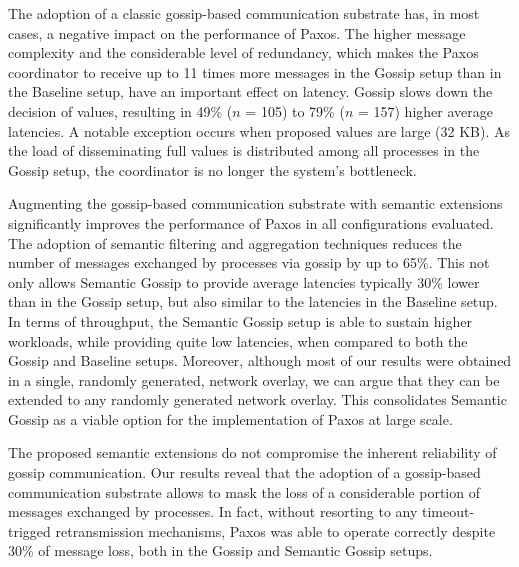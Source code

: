 The adoption of a classic gossip-based communication substrate has, in most
cases, a negative impact on the performance of Paxos.
The higher message complexity and the considerable level of redundancy, which
makes the Paxos coordinator to receive up to 11 times more messages in the
Gossip setup than in the Baseline setup, have an important effect on latency.
Gossip slows down the decision of values, resulting in 49\% ($n$ =
105) to 79\% ($n$ = 157) higher average latencies.
%
A notable exception occurs when proposed values are large (32 KB).
As the load of disseminating full values is distributed among all processes in
the Gossip setup, the coordinator is no longer the system's bottleneck.

Augmenting the gossip-based communication substrate with semantic extensions
significantly improves the performance of Paxos in all configurations
evaluated.
The adoption of semantic filtering and aggregation techniques reduces the number
of messages exchanged by processes via gossip by up to 65\%.
This not only allows Semantic Gossip to provide average latencies typically
30\% lower than in the Gossip setup, but also similar to the latencies in the
Baseline setup.
In terms of throughput, the Semantic Gossip setup is able to sustain higher
workloads, while providing quite low latencies, when compared to both the
Gossip and Baseline setups.
%
Moreover, although most of our results were obtained in a single, randomly
generated, network overlay, we can argue that they can be extended to any
randomly generated network overlay.
%
This consolidates Semantic Gossip as a viable option for the implementation of
Paxos at large scale.

The proposed semantic extensions do not compromise the inherent reliability of
gossip communication.
Our results reveal that the adoption of a gossip-based communication substrate
allows to mask the loss of a considerable portion of messages exchanged by
processes.
In fact, without resorting to any timeout-trigged
retransmission mechanisms, Paxos was able to operate correctly despite 30\% of
message loss, both in the Gossip and Semantic Gossip setups.
